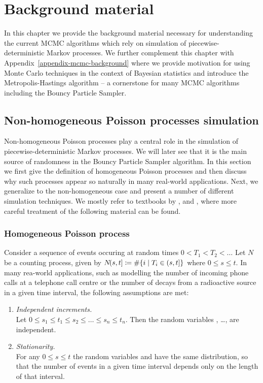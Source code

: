 \documentclass[report.tex]{subfiles}
\begin{document}
\chapter{Background material}

In this chapter we provide the background material necessary for understanding the
current MCMC algorithms which rely on simulation of
piecewise-deterministic Markov processes.
We further complement this chapter with Appendix~\ref{appendix-mcmc-background}
where we provide motivation for using Monte Carlo techniques in the context of
Bayesian statistics and
introduce the Metropolis-Hastings algorithm
-- a cornerstone for many MCMC algorithms including the Bouncy Particle Sampler.


\section{Non-homogeneous Poisson processes simulation}
\label{background-material-poisson-processes}


Non-homogeneous Poisson processes play a central role in the simulation of
piecewise-deterministic Markov processes. We will later see that it is
the main source of randomness in the Bouncy Particle Sampler algorithm.
In this section we first give the definition of homogeneous Poisson processes
and then discuss why such processes appear so naturally in many real-world applications.
Next, we generalize to the non-homogeneous case and present a number of different
simulation techniques.
We mostly refer to textbooks by
\citet{devroye2013non},
\citet{feller1968Introduction} and
\citet{ross1996stochastic},
where more careful treatment of the following material can be found.

\subsection{Homogeneous Poisson process}

Consider a sequence of events occuring at random times
$0 < T_{1} < T_{2} < \dots$ Let $N$ be a counting process, given by
${N}\!({s},{t}] \coloneqq \# \{ i \mid T_{i} \in (s, t] \}$ where
$0 \leq s \leq t$.
In many rea-world applications, such as modelling the number of incoming
phone calls at a telephone call centre or the number of decays from a
radioactive source in a given time interval, the following assumptions are met:

\begin{enumerate}
  \item \textit{Independent increments.} \\
  Let $0 \leq s_{1} \leq t_{1} \leq s_{2} \leq \dots \leq s_{n} \leq t_{n}$.
  Then the random variables
  , \dots, 
  are independent.

  \item \textit{Stationarity.} \\
  For any $0 \leq s \leq t$ the random variables
   and 
  have the same distribution, so that the number of events in a given time
  interval depends only on the length of that interval.
\end{enumerate}
\end{document}
